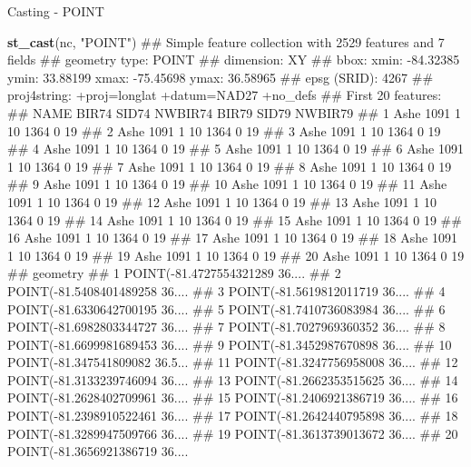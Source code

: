 \documentclass[11pt,ignorenonframetext,]{beamer}
\newenvironment{Shaded}{}{}
\newcommand{\KeywordTok}[1]{\textcolor[rgb]{0.00,0.44,0.13}{\textbf{#1}}}
\newcommand{\StringTok}[1]{\textcolor[rgb]{0.25,0.44,0.63}{#1}}
\newcommand{\NormalTok}[1]{#1}
\let\oldShaded\Shaded
\let\endoldShaded\endShaded
\renewenvironment{Shaded}{\footnotesize\begin{spacing}{0.9}\oldShaded}{\endoldShaded\end{spacing}}
\let\oldverbatim\verbatim
\let\endoldverbatim\endverbatim
\newcommand{\scriptoutput}{
  \renewenvironment{Shaded}{\scriptsize\begin{spacing}{0.9}\oldShaded}{\endoldShaded\end{spacing}}
  \renewenvironment{verbatim}{\scriptsize\begin{spacing}{0.9}\oldverbatim}{\endoldverbatim\end{spacing}}
}
\begin{document}
\begin{frame}[fragile,t]{Casting - POINT}

\scriptoutput

\begin{Shaded}
\begin{Highlighting}[]
\KeywordTok{st_cast}\NormalTok{(nc, }\StringTok{"POINT"}\NormalTok{)}
\NormalTok{## Simple feature collection with 2529 features and 7 fields}
\NormalTok{## geometry type:  POINT}
\NormalTok{## dimension:      XY}
\NormalTok{## bbox:           xmin: -84.32385 ymin: 33.88199 xmax: -75.45698 ymax: 36.58965}
\NormalTok{## epsg (SRID):    4267}
\NormalTok{## proj4string:    +proj=longlat +datum=NAD27 +no_defs}
\NormalTok{## First 20 features:}
\NormalTok{##    NAME BIR74 SID74 NWBIR74 BIR79 SID79 NWBIR79}
\NormalTok{## 1  Ashe  1091     1      10  1364     0      19}
\NormalTok{## 2  Ashe  1091     1      10  1364     0      19}
\NormalTok{## 3  Ashe  1091     1      10  1364     0      19}
\NormalTok{## 4  Ashe  1091     1      10  1364     0      19}
\NormalTok{## 5  Ashe  1091     1      10  1364     0      19}
\NormalTok{## 6  Ashe  1091     1      10  1364     0      19}
\NormalTok{## 7  Ashe  1091     1      10  1364     0      19}
\NormalTok{## 8  Ashe  1091     1      10  1364     0      19}
\NormalTok{## 9  Ashe  1091     1      10  1364     0      19}
\NormalTok{## 10 Ashe  1091     1      10  1364     0      19}
\NormalTok{## 11 Ashe  1091     1      10  1364     0      19}
\NormalTok{## 12 Ashe  1091     1      10  1364     0      19}
\NormalTok{## 13 Ashe  1091     1      10  1364     0      19}
\NormalTok{## 14 Ashe  1091     1      10  1364     0      19}
\NormalTok{## 15 Ashe  1091     1      10  1364     0      19}
\NormalTok{## 16 Ashe  1091     1      10  1364     0      19}
\NormalTok{## 17 Ashe  1091     1      10  1364     0      19}
\NormalTok{## 18 Ashe  1091     1      10  1364     0      19}
\NormalTok{## 19 Ashe  1091     1      10  1364     0      19}
\NormalTok{## 20 Ashe  1091     1      10  1364     0      19}
\NormalTok{##                          geometry}
\NormalTok{## 1  POINT(-81.4727554321289 36....}
\NormalTok{## 2  POINT(-81.5408401489258 36....}
\NormalTok{## 3  POINT(-81.5619812011719 36....}
\NormalTok{## 4  POINT(-81.6330642700195 36....}
\NormalTok{## 5  POINT(-81.7410736083984 36....}
\NormalTok{## 6  POINT(-81.6982803344727 36....}
\NormalTok{## 7  POINT(-81.7027969360352 36....}
\NormalTok{## 8  POINT(-81.6699981689453 36....}
\NormalTok{## 9  POINT(-81.3452987670898 36....}
\NormalTok{## 10 POINT(-81.347541809082 36.5...}
\NormalTok{## 11 POINT(-81.3247756958008 36....}
\NormalTok{## 12 POINT(-81.3133239746094 36....}
\NormalTok{## 13 POINT(-81.2662353515625 36....}
\NormalTok{## 14 POINT(-81.2628402709961 36....}
\NormalTok{## 15 POINT(-81.2406921386719 36....}
\NormalTok{## 16 POINT(-81.2398910522461 36....}
\NormalTok{## 17 POINT(-81.2642440795898 36....}
\NormalTok{## 18 POINT(-81.3289947509766 36....}
\NormalTok{## 19 POINT(-81.3613739013672 36....}
\NormalTok{## 20 POINT(-81.3656921386719 36....}
\end{Highlighting}
\end{Shaded}

\end{frame}
\end{document}
